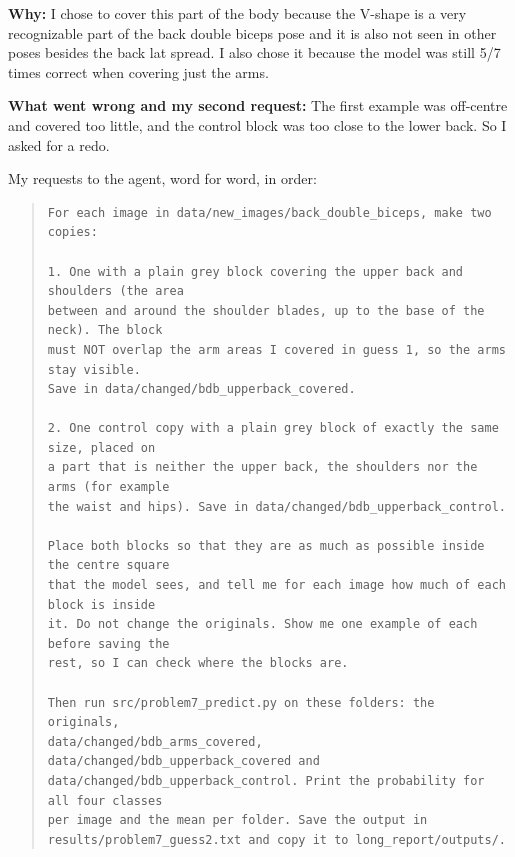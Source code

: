 \documentclass[11pt]{article}
\begin{document}
\textbf{Why:} I chose to cover this part of the body because the V-shape is a very recognizable part of the back double biceps pose and it is also not seen in other poses besides the back lat spread. I also chose it because the model was still 5/7 times correct when covering just the arms.

\textbf{What went wrong and my second request:} The first example was off-centre and covered too little, and the control block was too close to the lower back. So I asked for a redo.

My requests to the agent, word for word, in order:
\begin{quote}
\begin{Verbatim}[breaklines, fontsize=\small]
For each image in data/new_images/back_double_biceps, make two copies:

1. One with a plain grey block covering the upper back and shoulders (the area
between and around the shoulder blades, up to the base of the neck). The block
must NOT overlap the arm areas I covered in guess 1, so the arms stay visible.
Save in data/changed/bdb_upperback_covered.

2. One control copy with a plain grey block of exactly the same size, placed on
a part that is neither the upper back, the shoulders nor the arms (for example
the waist and hips). Save in data/changed/bdb_upperback_control.

Place both blocks so that they are as much as possible inside the centre square
that the model sees, and tell me for each image how much of each block is inside
it. Do not change the originals. Show me one example of each before saving the
rest, so I can check where the blocks are.

Then run src/problem7_predict.py on these folders: the originals,
data/changed/bdb_arms_covered, data/changed/bdb_upperback_covered and
data/changed/bdb_upperback_control. Print the probability for all four classes
per image and the mean per folder. Save the output in
results/problem7_guess2.txt and copy it to long_report/outputs/.
\end{Verbatim}
\end{quote}
\end{document}
